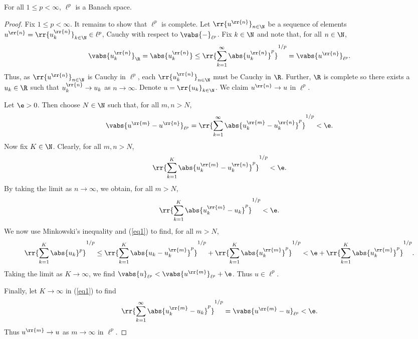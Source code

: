 \documentclass{article}
\begin{document}
\begin{claim*}[4]
  For all $1\leq p<\infty$, $\ell^p$ is a Banach space.
  \begin{proof}
    Fix $1\leq p<\infty$. It remains to show that $\ell^p$ is complete. Let $\rr{u^{\rr{n}}}_{n\in\N}$ be a sequence
    of elements $u^{\rr{n}}=\rr{u^{\rr{n}}_k}_{k\in\N}\in\ell^p$, Cauchy with respect to $\vabs{-}_{\ell^p}$.
    Fix $k\in\N$ and note that, for all $n\in\N$,
    \begin{align*}
      \vabs{u_k^{\rr{n}}}_{\R}=\abs{u_k^{\rr{n}}} \leq \rr{\sum_{k=1}^{\infty} \abs{u_k^{\rr{n}}}^p}^{1/p}=\vabs{u^{\rr{n}}}_{\ell^p}.
    \end{align*}
    Thus, as $\rr{u^{\rr{n}}}_{n\in\N}$ is Cauchy in $\ell^p$, each $\rr{u^{\rr{n}}_k}_{n\in\N}$ must be
    Cauchy in $\R$. Further, $\R$ is complete so there exists a $u_k\in\R$ such that $u^{\rr{n}}_k\to u_k$ as
    $n\to\infty$. Denote $u=\rr{u_k}_{k\in\N}$. We claim $u^{\rr{n}}\to u$ in $\ell^p$.

    Let $\e>0$. Then choose $N\in\N$ such that, for all $m,n>N$,
    \begin{align*}
      \vabs{u^{\rr{m}} - u^{\rr{n}}}_{\ell^p} = \rr{\sum_{k=1}^{\infty} \abs{u^{\rr{m}}_k-u^{\rr{n}}_k}^p}^{1/p} < \e.
    \end{align*}
    Now fix $K\in\N$. Clearly, for all $m,n>N$,
    \begin{align*}
      \rr{\sum_{k=1}^{K} \abs{u^{\rr{m}}_k-u^{\rr{n}}_k}^p}^{1/p} < \e.
    \end{align*}
    By taking  the limit as $n\to\infty$, we obtain, for all $m>N$,
    \begin{align}
      \label{eq1}
      \rr{\sum_{k=1}^{K} \abs{u^{\rr{m}}_k-u_k}^p}^{1/p} < \e.
    \end{align}
    We now use Minkowski's inequality and (\ref{eq1}) to find, for all $m>N$,
    \begin{align*}
      \rr{\sum_{k=1}^{K} \abs{u_k}^p}^{1/p} \leq \rr{\sum_{k=1}^{K} \abs{u_k-u^{\rr{m}}_k}^p}^{1/p} + \rr{\sum_{k=1}^{K} \abs{u^{\rr{m}}_k}^p}^{1/p}
      < \e + \rr{\sum_{k=1}^{K} \abs{u^{\rr{m}}_k}^p}^{1/p}.
    \end{align*}
    Taking the limit as $K\to\infty$, we find $\vabs{u}_{\ell^p} < \vabs{u^{\rr{m}}}_{\ell^p} + \e$. Thus $u\in\ell^p$.

    Finally, let $K\to\infty$ in (\ref{eq1}) to find
    \begin{align*}
      \rr{\sum_{k=1}^{\infty} \abs{u^{\rr{m}}_k-u_k}^p}^{1/p} = \vabs{u^{\rr{m}}-u}_{\ell^p}< \e.
    \end{align*}
    Thus $u^{\rr{m}}\to u$ as $m\to\infty$ in $\ell^p$.
  \end{proof}
\end{claim*}
\end{document}
